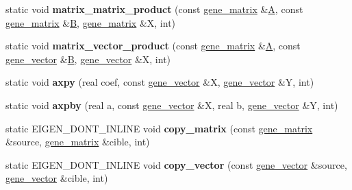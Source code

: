 \begin{DoxyCompactItemize}
\item 
\mbox{\label{classtensor__interface_a77f641ab91d01c341f26af6a5ee6c194}} 
static void {\bfseries matrix\+\_\+matrix\+\_\+product} (const \hyperlink{class_eigen_1_1_tensor}{gene\+\_\+matrix} \&\hyperlink{group___core___module_class_eigen_1_1_matrix}{A}, const \hyperlink{class_eigen_1_1_tensor}{gene\+\_\+matrix} \&\hyperlink{group___core___module_class_eigen_1_1_matrix}{B}, \hyperlink{class_eigen_1_1_tensor}{gene\+\_\+matrix} \&X, int)
\item 
\mbox{\label{classtensor__interface_a8c859c9a56554907eff907233548241a}} 
static void {\bfseries matrix\+\_\+vector\+\_\+product} (const \hyperlink{class_eigen_1_1_tensor}{gene\+\_\+matrix} \&\hyperlink{group___core___module_class_eigen_1_1_matrix}{A}, const \hyperlink{class_eigen_1_1_tensor}{gene\+\_\+vector} \&\hyperlink{group___core___module_class_eigen_1_1_matrix}{B}, \hyperlink{class_eigen_1_1_tensor}{gene\+\_\+vector} \&X, int)
\item 
\mbox{\label{classtensor__interface_a39db73e71870bccd9bf1003f00b6d921}} 
static void {\bfseries axpy} (real coef, const \hyperlink{class_eigen_1_1_tensor}{gene\+\_\+vector} \&X, \hyperlink{class_eigen_1_1_tensor}{gene\+\_\+vector} \&Y, int)
\item 
\mbox{\label{classtensor__interface_a82ae19986ec5ce20916994cb6bdff53c}} 
static void {\bfseries axpby} (real a, const \hyperlink{class_eigen_1_1_tensor}{gene\+\_\+vector} \&X, real b, \hyperlink{class_eigen_1_1_tensor}{gene\+\_\+vector} \&Y, int)
\item 
\mbox{\label{classtensor__interface_a1eceb8d5c423dd31f0da851c33a77000}} 
static E\+I\+G\+E\+N\+\_\+\+D\+O\+N\+T\+\_\+\+I\+N\+L\+I\+NE void {\bfseries copy\+\_\+matrix} (const \hyperlink{class_eigen_1_1_tensor}{gene\+\_\+matrix} \&source, \hyperlink{class_eigen_1_1_tensor}{gene\+\_\+matrix} \&cible, int)
\item 
\mbox{\label{classtensor__interface_a7d6a1019a054d36122b0cc1e753fca8c}} 
static E\+I\+G\+E\+N\+\_\+\+D\+O\+N\+T\+\_\+\+I\+N\+L\+I\+NE void {\bfseries copy\+\_\+vector} (const \hyperlink{class_eigen_1_1_tensor}{gene\+\_\+vector} \&source, \hyperlink{class_eigen_1_1_tensor}{gene\+\_\+vector} \&cible, int)

\end{DoxyCompactItemize}
